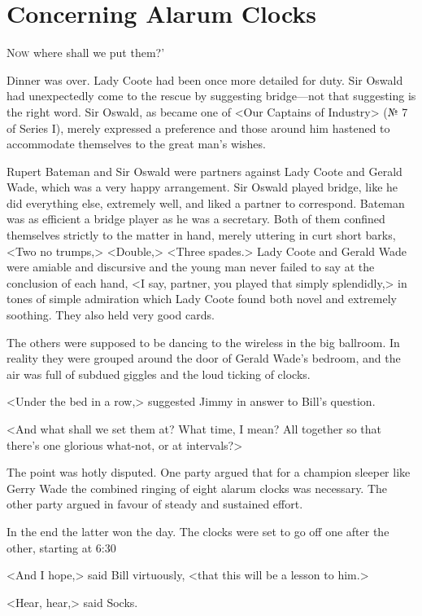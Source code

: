 \chapter{Concerning Alarum Clocks}

\lettrine[ante=`]{N}{ow}  where shall we put them?'

\zz
Dinner was over. Lady Coote had been once more detailed for duty. Sir Oswald had unexpectedly come to the rescue by suggesting bridge—not that suggesting is the right word. Sir Oswald, as became one of <Our Captains of Industry> (№ 7 of Series I), merely expressed a preference and those around him hastened to accommodate themselves to the great man's wishes.

Rupert Bateman and Sir Oswald were partners against Lady Coote and Gerald Wade, which was a very happy arrangement. Sir Oswald played bridge, like he did everything else, extremely well, and liked a partner to correspond. Bateman was as efficient a bridge player as he was a secretary. Both of them confined themselves strictly to the matter in hand, merely uttering in curt short barks, <Two no trumps,> <Double,> <Three spades.> Lady Coote and Gerald Wade were amiable and discursive and the young man never failed to say at the conclusion of each hand, <I say, partner, you played that simply splendidly,> in tones of simple admiration which Lady Coote found both novel and extremely soothing. They also held very good cards.

The others were supposed to be dancing to the wireless in the big ballroom. In reality they were grouped around the door of Gerald Wade's bedroom, and the air was full of subdued giggles and the loud ticking of clocks.

<Under the bed in a row,> suggested Jimmy in answer to Bill's question.

<And what shall we set them at? What time, I mean? All together so that there's one glorious what-not, or at intervals?>

The point was hotly disputed. One party argued that for a champion sleeper like Gerry Wade the combined ringing of eight alarum clocks was necessary. The other party argued in favour of steady and sustained effort.

In the end the latter won the day. The clocks were set to go off one after the other, starting at 6:30 

<And I hope,> said Bill virtuously, <that this will be a lesson to him.>

<Hear, hear,> said Socks.

